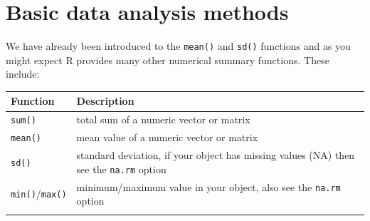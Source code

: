 \documentclass[a4paper]{book}
\begin{document}
\section{Basic data analysis methods}\label{basic-data-analysis-methods}

We have already been introduced to the \texttt{mean()} and \texttt{sd()}
functions and as you might expect R provides many other numerical
summary functions. These include:

\begin{longtable}[]{@{}ll@{}}
\toprule
\begin{minipage}[b]{0.14\columnwidth}\raggedright\strut
Function\strut
\end{minipage} & \begin{minipage}[b]{0.80\columnwidth}\raggedright\strut
Description\strut
\end{minipage}\tabularnewline
\midrule
\endhead
\begin{minipage}[t]{0.14\columnwidth}\raggedright\strut
\texttt{sum()}\strut
\end{minipage} & \begin{minipage}[t]{0.80\columnwidth}\raggedright\strut
total sum of a numeric vector or matrix\strut
\end{minipage}\tabularnewline
\begin{minipage}[t]{0.14\columnwidth}\raggedright\strut
\texttt{mean()}\strut
\end{minipage} & \begin{minipage}[t]{0.80\columnwidth}\raggedright\strut
mean value of a numeric vector or matrix\strut
\end{minipage}\tabularnewline
\begin{minipage}[t]{0.14\columnwidth}\raggedright\strut
\texttt{sd()}\strut
\end{minipage} & \begin{minipage}[t]{0.80\columnwidth}\raggedright\strut
standard deviation, if your object has missing values (NA) then see the
\texttt{na.rm} option\strut
\end{minipage}\tabularnewline
\begin{minipage}[t]{0.14\columnwidth}\raggedright\strut
\texttt{min()}/\texttt{max()}\strut
\end{minipage} & \begin{minipage}[t]{0.80\columnwidth}\raggedright\strut
minimum/maximum value in your object, also see the \texttt{na.rm}
option\strut
\end{minipage}\tabularnewline
\begin{minipage}[t]{0.14\columnwidth}\raggedright\strut

\end{minipage}
\end{longtable}
\end{document}

